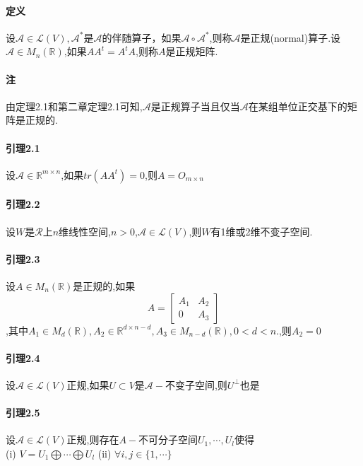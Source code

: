 \documentclass{ctexart}
\begin{document}
\fi

\paragraph{定义}
设$\mathcal{A} \in \mathcal{L}(V),\mathcal{A}^{*}$是$\mathcal{A}$的伴随算子，如果$\mathcal{A} \circ \mathcal{A}^{*}$,则称$\mathcal{A}$是正规(normal)算子.设$\mathcal{A} \in M_{n}(\mathbb{R})$,如果$AA^{t} = A^{t}A$,则称$A$是正规矩阵.

\paragraph{注}
由定理2.1和第二章定理2.1可知,$\mathcal{A}$是正规算子当且仅当$\mathcal{A}$在某组单位正交基下的矩阵是正规的.

\paragraph{引理2.1}
设$\mathcal{A} \in \mathbb{R}^{m \times n}$,如果$tr(AA^{t}) = 0$,则$A = O_{m \times n}$

\paragraph{引理2.2}
设$W$是$\mathcal{R}$上$n$维线性空间,$n>0$,$\mathcal{A} \in \mathcal{L}(V)$,则$W$有1维或2维不变子空间.

\paragraph{引理2.3}
设$A \in M_{n}(\mathbb{R})$是正规的,如果
$$
 A =
 \left[
 \begin{matrix}
  A_{1} & A_{2} \\
   0 & A_{3}
  \end{matrix}
  \right]
$$,其中$A_{1} \in M_{d}(\mathbb{R}),A_{2} \in \mathbb{R}^{d \times n-d},A_{3} \in M_{n-d}(\mathbb{R}),0<d<n.$,则$A_{2} = 0$

\paragraph{引理2.4}
设$\mathcal{A} \in \mathcal{L}(V)$正规,如果$U \subset V$是$\mathcal{A}-$不变子空间,则$U^{\bot}$也是

\paragraph{引理2.5}
设$\mathcal{A} \in \mathcal{L}(V)$正规,则存在$A-$不可分子空间$U_{1},\cdots,U_{l}$使得\\
(i) $V = U_{1} \bigoplus \cdots \bigoplus U_{l}$
(ii) $\forall i,j \in \{1,\cdots\}$

\ifx\total\undefined 
\end{document}
